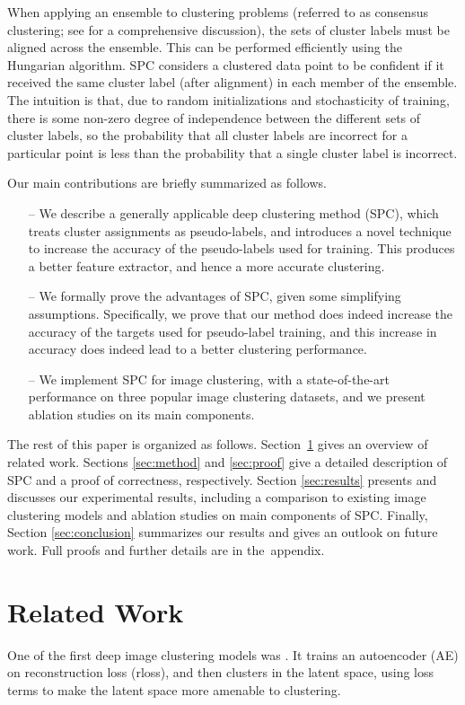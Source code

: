 \documentclass[runningheads]{llncs}
\begin{document}
When applying an ensemble to clustering problems (referred to as consensus clustering; see \cite{boongoen2018cluster} for a comprehensive discussion), the sets of cluster labels must be aligned across the ensemble. This can be performed efficiently using the Hungarian algorithm. SPC considers a clustered data point to be confident if it received the same cluster label (after alignment) in each member of the ensemble. The intuition is that, due to random initializations and stochasticity of training, there is some non-zero degree of independence between the different sets of cluster labels, so the probability that all cluster labels are incorrect for a particular point is less than the probability that a single cluster label is incorrect.

Our main contributions are briefly summarized as follows.

\begin{itemize}
\item[--] We describe a generally applicable deep clustering method (SPC), which treats cluster assignments as pseudo-labels, and introduces a novel technique to increase the accuracy of the pseudo-labels used for training. This produces a better feature extractor, and hence a more accurate clustering. 
    \item[--] We formally prove the advantages of SPC, given some simplifying assumptions. Specifically, we prove that our method does indeed increase the accuracy of the targets used for pseudo-label training, and this increase in accuracy does indeed lead to a better clustering performance. 
    \item[--] We implement SPC for  image clustering, with a state-of-the-art performance on three popular image clustering datasets, and we present ablation studies on its main components. 
\end{itemize}

The rest of this paper is organized as follows. Section~\ref{sec:related-work} gives an overview of related work. Sections \ref{sec:method} and \ref{sec:proof} give a detailed description of SPC and a proof of correctness, respectively. Section \ref{sec:results} presents and discusses our experimental results, including a comparison to existing image clustering models and ablation studies on main components of SPC. Finally, Section \ref{sec:conclusion} summarizes our results and gives  an outlook on future work. Full proofs and further details are in the~appendix. \section{Related Work} \label{sec:related-work}
One of the first deep image clustering models was \cite{huang2014deep}. 
It trains an autoencoder (AE) on reconstruction loss (rloss), and then clusters in the latent space, using loss terms to make the latent space more amenable to clustering.
\end{document}
